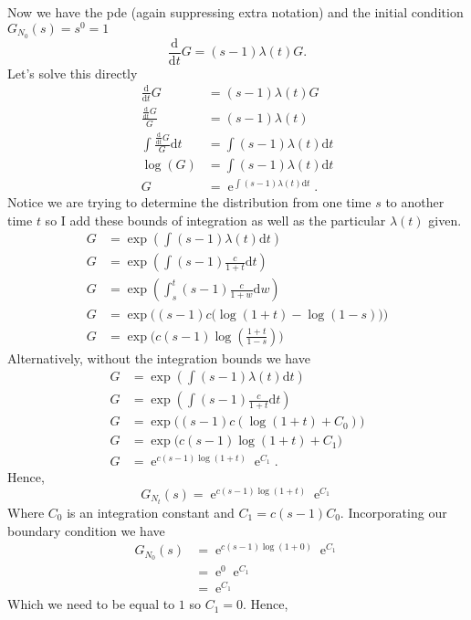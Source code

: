 \documentclass[10pt]{amsart}
\newcommand{\D}{\mathrm{d}}
\DeclareMathOperator{\E}{e}
\begin{document}
Now we have the pde (again suppressing extra notation) and the initial condition $G_{N_0}(s) = s^0 = 1$
$$
\frac {\D }{\D t} G = (s  - 1) \lambda(t) G.
$$
Let's solve this directly
\begin{align*}
\frac {\D }{\D t} G &= (s  - 1) \lambda(t) G \\
\frac {\frac {\D }{\D t} G}{G} &= (s  - 1) \lambda(t) \\
\int \frac {\frac {\D }{\D t} G}{G} \D t &= \int (s  - 1) \lambda(t) \D t \\
\log \left( G \right) &= \int (s  - 1) \lambda(t) \D t \\
G &= \E^{\int (s  - 1) \lambda(t) \D t}.
\end{align*}
Notice we are trying to determine the distribution from one time $s$ to another time $t$ so I add these bounds of integration as well as the particular $\lambda(t)$ given.
\begin{align*}
G &= \exp\left(\int (s  - 1) \lambda(t) \D t \right) \\
G &= \exp\left(\int (s  - 1) \frac c {1 + t} \D t \right) \\
G &= \exp\left(\int_s^t (s  - 1) \frac c {1 + w} \D w\right) \\
G &= \exp\bigg( (s  - 1) c \Big( \log(1 + t) - \log(1 - s) \Big) \bigg) \\
G &= \exp\bigg( c (s  - 1) \log\left(\frac {1 + t}{1 - s}\right) \bigg)
\end{align*}
Alternatively, without the integration bounds we have
\begin{align*}
G &= \exp\left(\int (s  - 1) \lambda(t) \D t \right) \\
G &= \exp\left(\int (s  - 1) \frac c {1 + t} \D t \right) \\
G &= \exp\Big((s  - 1) c (\log (1 + t) + C_0) \Big) \\
G &= \exp\Big( c (s  - 1) \log (1 + t) + C_1\Big) \\
G &= \E^{ c (s  - 1) \log (1 + t)} \E^{C_1}.
\end{align*}
Hence, 
$$
G_{N_t}(s) = \E^{ c (s  - 1) \log (1 + t)} \E^{C_1}
$$
Where $C_0$ is an integration constant and $C_1 = c (s - 1)C_0$.
Incorporating our boundary condition we have
\begin{align*}
G_{N_0}(s) &= \E^{ c (s  - 1) \log (1 + 0)} \E^{C_1} \\
	&= \E^{0} \E^{C_1} \\
	&= \E^{C_1}
\end{align*}
Which we need to be equal to $1$ so $C_1 = 0$.
Hence,
\end{document}
